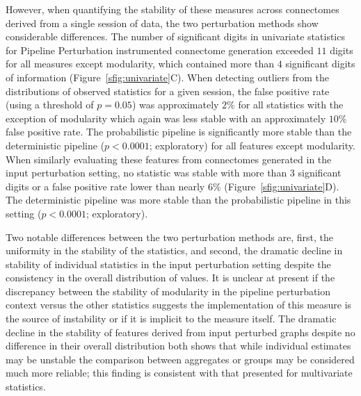 \documentclass[fleqn,10pt]{SelfArx} %
\begin{document}
However, when quantifying the stability of these measures across connectomes derived from a single session of data, the
two perturbation methods show considerable differences. The number of significant digits in univariate statistics for
Pipeline Perturbation instrumented connectome generation exceeded $11$ digits for all measures except modularity, which
contained more than $4$ significant digits of information (Figure~\ref{sfig:univariate}C). When detecting outliers from
the distributions of observed statistics for a given session, the false positive rate (using a threshold of $p = 0.05$)
was approximately $2\%$ for all statistics with the exception of modularity which again was less stable with an
approximately $10\%$ false positive rate. The probabilistic pipeline is significantly more stable than the
deterministic pipeline ($p < 0.0001$; exploratory) for all features except modularity. When similarly evaluating these
features from connectomes generated in the input perturbation setting, no statistic was stable with more than $3$
significant digits or a false positive rate lower than nearly $6\%$ (Figure~\ref{sfig:univariate}D). The deterministic
pipeline was more stable than the probabilistic pipeline in this setting ($p < 0.0001$; exploratory).

Two notable differences between the two perturbation methods are, first, the uniformity in the stability of the
statistics, and second, the dramatic decline in stability of individual statistics in the input perturbation setting
despite the consistency in the overall distribution of values. It is unclear at present if the discrepancy between the
stability of modularity in the pipeline perturbation context versus the other statistics suggests the implementation of
this measure is the source of instability or if it is implicit to the measure itself. The dramatic decline in the
stability of features derived from input perturbed graphs despite no difference in their overall distribution both
shows that while individual estimates may be unstable the comparison between aggregates or groups may be considered
much more reliable; this finding is consistent with that presented for multivariate statistics.
\end{document}
